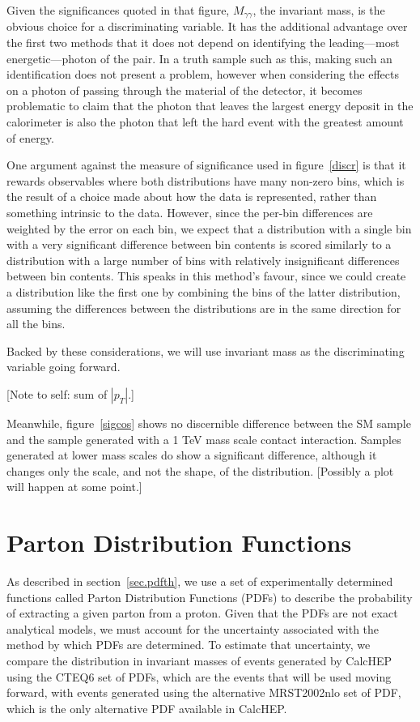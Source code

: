 Given the significances quoted in that figure, $M_{\gamma\gamma}$, the invariant mass, is the obvious choice for a discriminating variable. It has the additional advantage over the first two methods that it does not depend on identifying the leading---most energetic---photon of the pair. In a truth sample such as this, making such an identification does not present a problem, however when considering the effects on a photon of passing through the material of the detector, it becomes problematic to claim that the photon that leaves the largest energy deposit in the calorimeter is also the photon that left the hard event with the greatest amount of energy.

One argument against the measure of significance used in figure~\ref{discr} is that it rewards observables where both distributions have many non-zero bins, which is the result of a choice made about how the data is represented, rather than something intrinsic to the data. However, since the per-bin differences are weighted by the error on each bin, we expect that a distribution with a single bin with a very significant difference between bin contents is scored similarly to a distribution with a large number of bins with relatively insignificant differences between bin contents. This speaks in this method's favour, since we could create a distribution like the first one by combining the bins of the latter distribution, assuming the differences between the distributions are in the same direction for all the bins.

Backed by these considerations, we will use invariant mass as the discriminating variable going forward.

[Note to self: sum of $|p_T|$.]

Meanwhile, figure~\ref{sigcos} shows no discernible difference between the SM sample and the sample generated with a 1 TeV mass scale contact interaction. Samples generated at lower mass scales do show a significant difference, although it changes only the scale, and not the shape, of the distribution. [Possibly a plot will happen at some point.]

\section{Parton Distribution Functions}
As described in section~\ref{sec.pdfth}, we use a set of experimentally determined functions called Parton Distribution Functions (PDFs) to describe the probability of extracting a given parton from a proton. Given that the PDFs are not exact analytical models, we must account for the uncertainty associated with the method by which  PDFs are determined. To estimate that uncertainty, we compare the distribution in invariant masses of events generated by CalcHEP using the CTEQ6 set of PDFs, which are the events that will be used moving forward, with events generated using the alternative MRST2002nlo set of PDF, which is the only alternative PDF available in CalcHEP.

